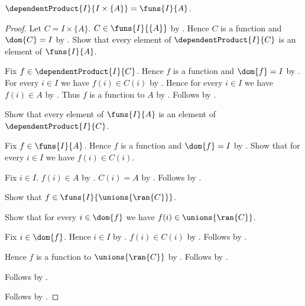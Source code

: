 \begin{theorem}\label{spike_constant_family_dependent_product}
    $\dependentProduct{I}{I\times\{A\}}=\funs{I}{A}$.
\end{theorem}
\begin{proof}
    Let $C=I\times\{A\}$.
    $C\in\funs{I}{\{A\}}$ by .
    Hence $C$ is a function and $\dom{C}=I$ by
        .
    Show that every element of $\dependentProduct{I}{C}$ is an element
        of $\funs{I}{A}$.
    \begin{subproof}
        Fix $f\in\dependentProduct{I}{C}$.
        Hence $f$ is a function and $\dom{f}=I$ by
            .
        For every $i\in I$ we have $f(i)\in C(i)$ by
            .
        Hence for every $i\in I$ we have $f(i)\in A$ by
            .
        Thus $f$ is a function to $A$ by \auto.
        Follows by .
    \end{subproof}
    Show that every element of $\funs{I}{A}$ is an element of
        $\dependentProduct{I}{C}$.
    \begin{subproof}
        Fix $f\in\funs{I}{A}$.
        Hence $f$ is a function and $\dom{f}=I$ by
            .
        Show that for every $i\in I$ we have $f(i)\in C(i)$.
        \begin{subproof}
            Fix $i\in I$.
            $f(i)\in A$ by .
            $C(i)=A$ by .
            Follows by \auto.
        \end{subproof}
        Show that $f\in\funs{I}{\unions{\ran{C}}}$.
        \begin{subproof}
            Show that for every $i\in\dom{f}$ we have
                $f(i)\in\unions{\ran{C}}$.
            \begin{subproof}
                Fix $i\in\dom{f}$.
                Hence $i\in I$ by \auto.
                $f(i)\in C(i)$ by \auto.
                Follows by .
            \end{subproof}
            Hence $f$ is a function to $\unions{\ran{C}}$ by \auto.
            Follows by .
        \end{subproof}
        Follows by .
    \end{subproof}
    Follows by .
\end{proof}

